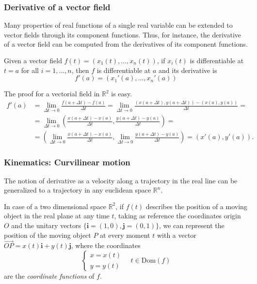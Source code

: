 \begin{frame}
\frametitle{Derivative of a vector field}
Many properties of real functions of a single real variable can be extended to vector fields through its component functions.
Thus, for instance, the derivative of a vector field can be computed from the derivatives of its component functions. 

\begin{theorem}
Given a vector field $f(t)=(x_1(t),\ldots,x_n(t))$, if $x_i(t)$ is differentiable at $t=a$ for all $i=1,\ldots,n$, then $f$ is differentiable at $a$ and its derivative is
\[
f'(a)=(x_1'(a),\ldots,x_n'(a))
\]
\end{theorem}

The proof for a vectorial field in $\mathbb{R}^2$ is easy.
\begin{align*}
f'(a)&=\lim_{\Delta t\rightarrow 0} \frac{f(a+\Delta t)-f(a)}{\Delta t} = \lim_{\Delta t\rightarrow 0} \frac{(x(a+\Delta t),y(a+\Delta t))-(x(a),y(a))}{\Delta t} =\\
&=  \lim_{\Delta t\rightarrow 0} \left(\frac{x(a+\Delta t)-x(a)}{\Delta t},\frac{y(a+\Delta t)-y(a)}{\Delta t}\right) =\\
&= \left(\lim_{\Delta t\rightarrow 0}\frac{x(a+\Delta t)-x(a)}{\Delta t},\lim_{\Delta t\rightarrow 0}\frac{y(a+\Delta t)-y(a)}{\Delta t}\right) =
(x'(a),y'(a)).
\end{align*}
\end{frame}


\begin{frame}
\frametitle{Kinematics: Curvilinear motion}
The notion of derivative as a velocity along a trajectory in the real line can be generalized to a trajectory in any euclidean space $\mathbb{R}^n$.

In case of a two dimensional space $\mathbb{R}^2$, if $f(t)$ describes the position of a moving object in the real plane at any time $t$, taking as reference the coordinates origin $O$ and the unitary vectors $\{\mathbf{i}=(1,0),\mathbf{j}=(0,1)\}$, we can represent the position of the moving object $P$ at every moment $t$ with a vector $\vec{OP}=x(t)\mathbf{i}+y(t)\mathbf{j}$, where the coordinates 
\[
\begin{cases}
x=x(t)\\
y=y(t)
\end{cases}
\quad
t\in \mbox{Dom}(f)
\]
are the \emph{coordinate functions} of $f$.

\begin{center}
\end{center}
\end{frame}


